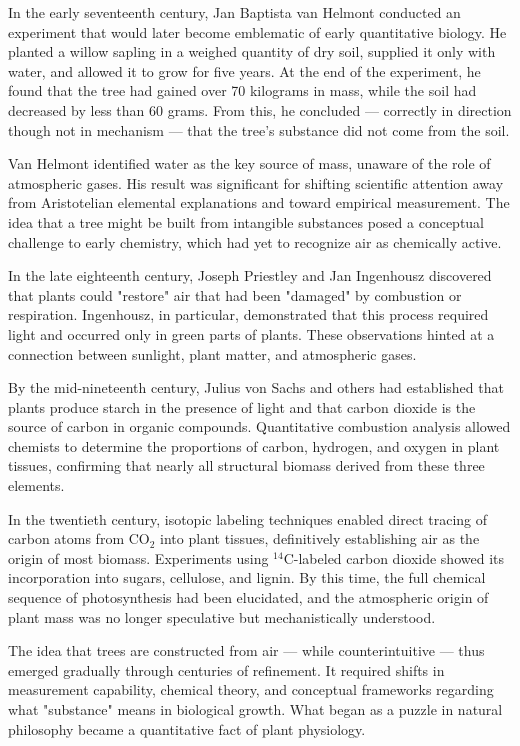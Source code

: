 \begin{historical}
In the early seventeenth century, Jan Baptista van Helmont conducted an experiment that would later become emblematic of early quantitative biology. He planted a willow sapling in a weighed quantity of dry soil, supplied it only with water, and allowed it to grow for five years. At the end of the experiment, he found that the tree had gained over 70 kilograms in mass, while the soil had decreased by less than 60 grams. From this, he concluded — correctly in direction though not in mechanism — that the tree’s substance did not come from the soil.

Van Helmont identified water as the key source of mass, unaware of the role of atmospheric gases. His result was significant for shifting scientific attention away from Aristotelian elemental explanations and toward empirical measurement. The idea that a tree might be built from intangible substances posed a conceptual challenge to early chemistry, which had yet to recognize air as chemically active.

In the late eighteenth century, Joseph Priestley and Jan Ingenhousz discovered that plants could "restore" air that had been "damaged" by combustion or respiration. Ingenhousz, in particular, demonstrated that this process required light and occurred only in green parts of plants. These observations hinted at a connection between sunlight, plant matter, and atmospheric gases.

By the mid-nineteenth century, Julius von Sachs and others had established that plants produce starch in the presence of light and that carbon dioxide is the source of carbon in organic compounds. Quantitative combustion analysis allowed chemists to determine the proportions of carbon, hydrogen, and oxygen in plant tissues, confirming that nearly all structural biomass derived from these three elements.

In the twentieth century, isotopic labeling techniques enabled direct tracing of carbon atoms from \(\mathrm{CO}_2\) into plant tissues, definitively establishing air as the origin of most biomass. Experiments using \(^{14}\mathrm{C}\)-labeled carbon dioxide showed its incorporation into sugars, cellulose, and lignin. By this time, the full chemical sequence of photosynthesis had been elucidated, and the atmospheric origin of plant mass was no longer speculative but mechanistically understood.

The idea that trees are constructed from air — while counterintuitive — thus emerged gradually through centuries of refinement. It required shifts in measurement capability, chemical theory, and conceptual frameworks regarding what "substance" means in biological growth. What began as a puzzle in natural philosophy became a quantitative fact of plant physiology.
\end{historical}
